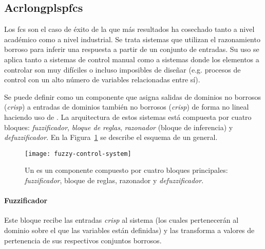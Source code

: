 \subsection{Acrlongplsp{fcs}}
\label{ss:fcs}

Los \Acrfull{fcs} son el caso de éxito de la  que más resultados ha cosechado tanto a nivel académico como a nivel industrial. Se trata sistemas que utilizan el razonamiento borroso para inferir una respuesta a partir de un conjunto de entradas. Su uso se aplica tanto a sistemas de control manual como a sistemas donde los elementos a controlar son muy difíciles o incluso imposibles de diseñar (e.g. procesos de control con un alto número de variables relacionadas entre sí).

Se puede definir como un componente que asigna salidas de dominios no borrosos (\textit{crisp}) a entradas de dominios también no borrosos (\textit{crisp}) de forma no lineal haciendo uso de . La arquitectura de estos sistemas está compuesta por cuatro bloques: \textit{fuzzificador}, \textit{bloque de reglas}, \textit{razonador} (bloque de inferencia) y \textit{defuzzificador}. En la Figura~\ref{fig:fuzzy-control-system} se describe el esquema de un  general.

\begin{figure}
	\centering
	\texttt{[image: fuzzy-control-system]}
	\caption[Esquema de un ]{Un  es un componente compuesto por cuatro bloques principales: \textit{fuzzificador}, bloque de reglas, razonador y \textit{defuzzificador}.}
	\label{fig:fuzzy-control-system}
\end{figure}

\paragraph{Fuzzificador}

Este bloque recibe las entradas \textit{crisp} al sistema (los cuales pertenecerán al dominio sobre el que las variables están definidas) y las transforma a valores de pertenencia de sus respectivos conjuntos borrosos.

